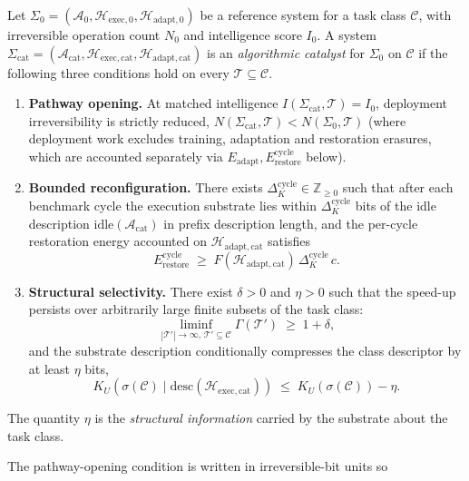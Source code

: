 \documentclass[runningheads]{llncs}
\newcommand{\Erasure}{c}
\newcommand{\IntOp}{I}
\newcommand{\Sys}{\Sigma}
\newcommand{\Nop}{N}
\newcommand{\Fover}{F}
\newcommand{\Alg}{\mathcal{A}}
\newcommand{\Hw}{\mathcal{H}}
\newcommand{\Task}{\mathcal{T}}
\newcommand{\Class}{\mathcal{C}}
\newcommand{\descop}{\mathrm{desc}}
\newcommand{\idle}{\mathrm{idle}}
\newcommand{\Erestore}{E_{\mathrm{restore}}^{\mathrm{cycle}}}
\newcommand{\Eadapt}{E_{\mathrm{adapt}}}
\begin{document}
\begin{definition}
\label{def:catalyst}
Let $\Sys_0=(\Alg_0,\Hw_{\mathrm{exec},0},\Hw_{\mathrm{adapt},0})$
be a reference system for a task class $\Class$, with irreversible
operation count $\Nop_0$ and intelligence score $\IntOp_0$. A system
$\Sys_{\mathrm{cat}}=(\Alg_{\mathrm{cat}},
\Hw_{\mathrm{exec,cat}},\Hw_{\mathrm{adapt,cat}})$ is an
\emph{algorithmic catalyst} for $\Sys_0$ on $\Class$ if the following
three conditions hold on every $\Task\subseteq\Class$.
\begin{enumerate}
\item \textbf{Pathway opening.} At matched intelligence
$\IntOp(\Sys_{\mathrm{cat}},\Task)=\IntOp_0$, deployment
irreversibility is strictly reduced,
$\Nop(\Sys_{\mathrm{cat}},\Task)<\Nop(\Sys_0,\Task)$ (where
deployment work excludes training, adaptation and restoration
erasures, which are accounted separately via $\Eadapt,\Erestore$ below).
\item \textbf{Bounded reconfiguration.} There exists
$\Delta_K^{\mathrm{cycle}}\in\mathbb{Z}_{\ge 0}$ such that after
each benchmark cycle the execution substrate lies within
$\Delta_K^{\mathrm{cycle}}$ bits of the idle description
$\idle(\Alg_{\mathrm{cat}})$ in prefix description length, and the
per-cycle restoration energy accounted on $\Hw_{\mathrm{adapt,cat}}$
satisfies
\begin{equation}
\label{eq:restore-energy}
\Erestore\;\ge\;
\Fover(\Hw_{\mathrm{adapt,cat}})\,\Delta_K^{\mathrm{cycle}}\,\Erasure.
\end{equation}
\item \textbf{Structural selectivity.} There exist $\delta>0$ and
$\eta>0$ such that the speed-up persists over arbitrarily large
finite subsets of the task class:\begin{equation}
\label{eq:transfer}
\liminf_{|\Task'|\to\infty,\,\Task'\subseteq\Class}
\Gamma(\Task')\;\ge\;1+\delta,
\end{equation}
and the substrate description conditionally compresses the class
descriptor by at least $\eta$ bits,
\begin{equation}
\label{eq:selectivity}
K_U\!\left(\sigma(\Class)\mid
\descop(\Hw_{\mathrm{exec,cat}})\right)\;\le\;
K_U(\sigma(\Class))-\eta.
\end{equation}
\end{enumerate}
The quantity $\eta$ is the \emph{structural information} carried by
the substrate about the task class.
\end{definition}
The pathway-opening condition is written in irreversible-bit units so
\end{document}
